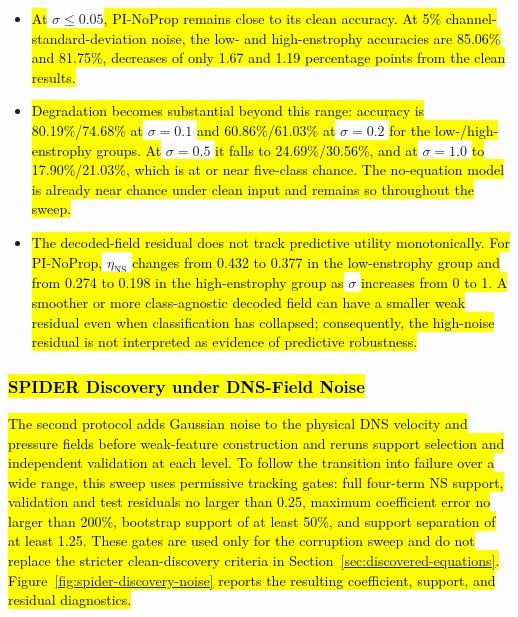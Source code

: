 \documentclass[preprint,12pt]{elsarticle}
\newcommand{\rev}[1]{\hl{#1}}
\newcommand{\revmath}[1]{\colorbox{yellow!25}{$#1$}}
\begin{document}
\begin{itemize}
    \item \rev{At }\revmath{\sigma\leq0.05}\rev{, PI-NoProp remains close to its clean accuracy. At 5\% channel-standard-deviation noise, the low- and high-enstrophy accuracies are 85.06\% and 81.75\%, decreases of only 1.67 and 1.19 percentage points from the clean results.}
    \item \rev{Degradation becomes substantial beyond this range: accuracy is 80.19\%/74.68\% at }\revmath{\sigma=0.1}\rev{ and 60.86\%/61.03\% at }\revmath{\sigma=0.2}\rev{ for the low-/high-enstrophy groups. At }\revmath{\sigma=0.5}\rev{ it falls to 24.69\%/30.56\%, and at }\revmath{\sigma=1.0}\rev{ to 17.90\%/21.03\%, which is at or near five-class chance. The no-equation model is already near chance under clean input and remains so throughout the sweep.}
    \item \rev{The decoded-field residual does not track predictive utility monotonically. For PI-NoProp, }\revmath{\eta_{\mathrm{NS}}}\rev{ changes from 0.432 to 0.377 in the low-enstrophy group and from 0.274 to 0.198 in the high-enstrophy group as }\revmath{\sigma}\rev{ increases from 0 to 1. A smoother or more class-agnostic decoded field can have a smaller weak residual even when classification has collapsed; consequently, the high-noise residual is not interpreted as evidence of predictive robustness.}
\end{itemize}

\subsubsection{\texorpdfstring{\rev{SPIDER Discovery under DNS-Field Noise}}{SPIDER Discovery under DNS-Field Noise}}

\rev{The second protocol adds Gaussian noise to the physical DNS velocity and pressure fields before weak-feature construction and reruns support selection and independent validation at each level. To follow the transition into failure over a wide range, this sweep uses permissive tracking gates: full four-term NS support, validation and test residuals no larger than 0.25, maximum coefficient error no larger than 200\%, bootstrap support of at least 50\%, and support separation of at least 1.25. These gates are used only for the corruption sweep and do not replace the stricter clean-discovery criteria in Section~\ref{sec:discovered-equations}. Figure~\ref{fig:spider-discovery-noise} reports the resulting coefficient, support, and residual diagnostics.}
\end{document}
